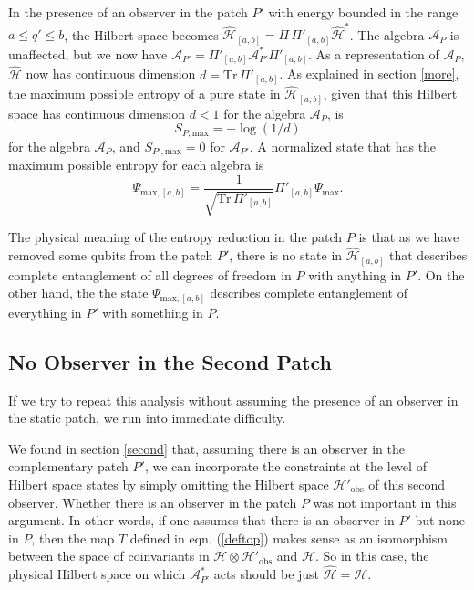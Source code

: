 \documentclass[11pt,a4paper]{article}
\def\be{\begin{equation}}
\def\ee{\end{equation}}
\def\h{\widehat}
\def\A{{\mathcal A}}
\def\h{\widehat}
\def\H{{\mathcal H}}
\def\obs{{\mathrm{obs}}}
\def\Tr{{\mathrm{Tr}}}
\begin{document}
   
   In the presence of an observer in the patch $P'$ with energy bounded in the range $a\leq q'\leq b$, the Hilbert space becomes
   $\h \H_{[a,b]}=\Pi \,\Pi'_{[a,b]} \h\H^*$.   The algebra $\A_P$ is unaffected, but we now have $\A_{P'}=\Pi'_{[a,b]}\A_{P'}^* \Pi'_{[a,b]}$.    As a representation of $\A_P$,
   $\h\H$ now has continuous dimension $d=\Tr\,\Pi'_{[a,b]}$.  As explained in section \ref{more}, the maximum possible entropy of a pure state in $\h\H_{[a,b]}$, given
   that this Hilbert space has continuous dimension $d<1$ for the algebra $\A_P$, is 
   \be\label{smax} S_{P,\mathrm {max}}= -\log (1/d)\ee
    for the algebra $\A_P$, and $S_{P',\mathrm{max}}= 0$  for $\A_{P'}$.
     A normalized state that has the maximum possible entropy for each algebra is
   \be\label{newmax}\Psi_{\mathrm{max},[a,b]}=\frac{1}{\sqrt{\Tr\,\Pi'_{[a,b]}} }\Pi'_{[a,b]} \Psi_{\mathrm{max}}. \ee
   
   The physical meaning of the entropy reduction in the patch $P$ is that as we have removed some qubits from the patch $P'$, there is no state in $\h\H_{[a,b]}$
   that describes complete entanglement of all degrees of freedom in $P$ with anything in $P'$.  On the other hand, the the state $\Psi_{\mathrm{max},[a,b]}$ describes complete entanglement of everything in $P'$ with something in $P$.

   
   \subsection{No Observer in the Second Patch}\label{emptypatch}
   
   If we try to repeat this analysis without assuming the presence of an observer in the static patch, we run into immediate difficulty.
   
   We found in section \ref{second} that, assuming there is an observer in the complementary patch $P'$, we can incorporate the constraints at the level of
   Hilbert space states by simply omitting the Hilbert space $\H'_\obs$ of this second observer.  Whether there is an observer in the patch $P$ was not important in this
   argument.   In other words, if one assumes that there is an observer in $P'$ but none in $P$, then the map $T$ defined in eqn. (\ref{deftop}) makes sense
   as an isomorphism between the space of coinvariants in $\H\otimes \H'_\obs$   and $\H$.    So in this case, the physical Hilbert space on which $\A_{P'}^*$ acts
   should be just $\h\H=\H$.
   
\end{document}
